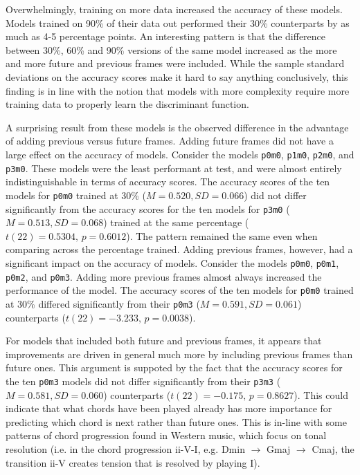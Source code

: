 Overwhelmingly, training on more data increased the accuracy of these models.
Models trained on 90\% of their data out performed their 30\% counterparts by
as much as 4-5 percentage points. An interesting pattern is that the difference
between 30\%, 60\% and 90\% versions of the same model increased as the more and
more future and previous frames were included. While the sample standard
deviations on the accuracy scores make it hard to say anything conclusively,
this finding is in line with the notion that models with more complexity
require more training data to properly learn the discriminant function.

A surprising result from these models is the observed difference in the
advantage of adding previous versus future frames. Adding future frames did not
have a large effect on the accuracy of models. Consider the models
\texttt{p0m0}, \texttt{p1m0}, \texttt{p2m0}, and \texttt{p3m0}. These models
were the least performant at test, and were almost entirely indistinguishable
in terms of accuracy scores. The accuracy scores of the ten models for
\texttt{p0m0} trained at 30\% ($M = 0.520, SD = 0.066$) did not differ
significantly from the accuracy scores for the ten models for \texttt{p3m0} ($M
= 0.513, SD = 0.068$) trained at the same percentage ($t(22) = 0.5304,\, p =
0.6012$). The pattern remained the same even when comparing across the
percentage trained. Adding previous frames, however, had a significant impact
on the accuracy of models. Consider the models \texttt{p0m0}, \texttt{p0m1},
\texttt{p0m2}, and \texttt{p0m3}. Adding more previous frames almost always
increased the performance of the model. The accuracy scores of the ten models
for \texttt{p0m0} trained at 30\% differed significantly from their
  \texttt{p0m3} ($M = 0.591, SD = 0.061$) counterparts ($t(22) = -3.233,\, p =
  0.0038$).

For models that included both future and previous frames, it appears that
improvements are driven in general much more by including previous frames than
future ones. This argument is suppoted by the fact that the accuracy scores for
the ten \texttt{p0m3} models did not differ significantly from their
\texttt{p3m3} ($M = 0.581, SD = 0.060$) counterparts ($t(22) = -0.175,\,p =
0.8627$). This could indicate that what chords have been played already has more
importance for predicting which chord is next rather than future ones. This is
in-line with some patterns of chord progression found in Western music, which
focus on tonal resolution (i.e. in the chord progression ii-V-I, e.g. Dmin
$\rightarrow$ Gmaj $\rightarrow$ Cmaj, the transition ii-V creates tension that
is resolved by playing I).



